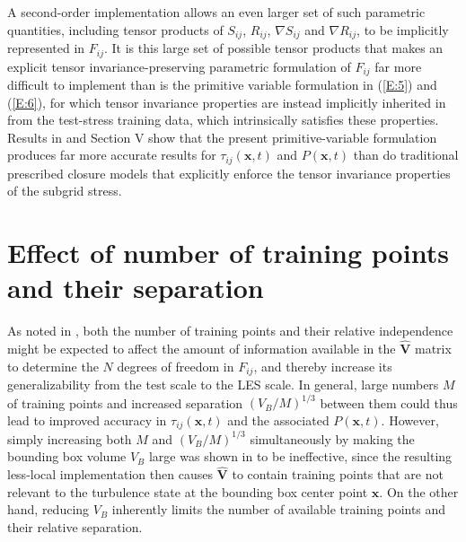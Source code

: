 A second-order implementation allows an even larger set of such parametric quantities, including tensor products of $S_{ij}$, $R_{ij}$,  $\nabla S_{ij}$ and $\nabla R_{ij}$, to be implicitly represented in $F_{ij}$. It is this large set of possible tensor products that makes an explicit tensor invariance-preserving parametric formulation of  $F_{ij}$ far more difficult to implement than is the primitive variable formulation in (\ref{E:5}) and (\ref{E:6}), for which tensor invariance properties are instead implicitly inherited in   from the test-stress training data, which intrinsically satisfies these properties. Results in  and Section V show that the present primitive-variable formulation produces far more accurate results for  $\tau_{ij}(\mathbf{x},t)$ and $P(\mathbf{x},t)$  than do traditional prescribed closure models that explicitly enforce the tensor invariance properties of the subgrid stress.

\section{Effect of number of training points and their separation}
\label{sec:IVE}

As noted in , both the number of training points and their relative independence might be expected to affect the amount of information available in the $\widehat{\mathbf{V}}$  matrix to determine the $N$ degrees of freedom in $F_{ij}$, and thereby increase its generalizability from the test scale to the LES scale. In general, large numbers $M$ of training points and increased separation $(V_B/M)^{1/3}$  between them could thus lead to improved accuracy in $\tau_{ij}(\mathbf{x},t)$  and the associated  $P(\mathbf{x},t)$. However, simply increasing both $M$ and $(V_B/M)^{1/3}$  simultaneously by making the bounding box volume  $V_B$ large was shown in  to be ineffective, since the resulting less-local implementation then causes $\widehat{\mathbf{V}}$ to contain training points that are not relevant to the turbulence state at the bounding box center point $\mathbf{x}$. On the other hand, reducing  $V_B$ inherently limits the number of available training points and their relative separation. 

